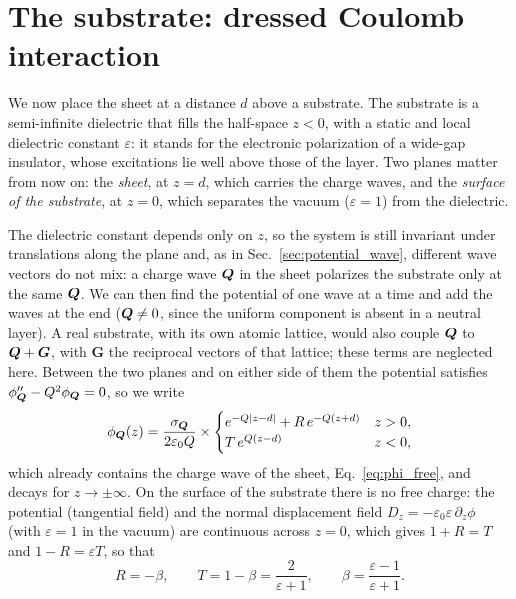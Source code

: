 \documentclass[10pt,a4paper]{paper}
\begin{document}
\section{The substrate: dressed Coulomb interaction}
\label{sec:image}

We now place the sheet at a distance $d$ above a substrate. The substrate is a semi-infinite dielectric that fills
the half-space $z < 0$, with a static and local dielectric constant $\varepsilon$: it stands for the electronic
polarization of a wide-gap insulator, whose excitations lie well above those of the layer. Two planes matter from now
on: the \emph{sheet}, at $z = d$, which carries the charge waves, and the \emph{surface of the substrate}, at
$z = 0$, which separates the vacuum ($\varepsilon = 1$) from the dielectric.

The dielectric constant depends only on $z$, so the system is still invariant under translations along the plane and,
as in Sec.~\ref{sec:potential_wave}, different wave vectors do not mix: a charge wave $\bm{Q}$ in the sheet polarizes the
substrate only at the same $\bm{Q}$. We can then find the potential of one wave at a time and add the waves at the end
($\bm{Q} \neq 0$, since the uniform component is absent in a neutral layer). A real substrate, with its own atomic
lattice, would also couple $\bm{Q}$ to $\bm{Q} + \bm{G}$, with $\bm{G}$ the reciprocal vectors of that lattice; these terms
are neglected here.
Between the two planes and on either side of them the potential satisfies $\phi''_{\bm{Q}} - Q^2\phi_{\bm{Q}} = 0$, so we
write
\begin{equation}
\phi_{\bm{Q}}(z) = \frac{\sigma_{\bm{Q}}}{2\varepsilon_0 Q}\times
\begin{cases}
e^{-Q|z-d|} + R\,e^{-Q(z+d)} & z > 0 , \\
T\,e^{Q(z-d)} & z < 0 ,
\end{cases}
\label{eq:phi_sub_ansatz}
\end{equation}
which already contains the charge wave of the sheet, Eq.~\eqref{eq:phi_free}, and decays for $z \to \pm\infty$. On
the surface of the substrate there is no free charge: the potential (tangential field) and the normal displacement
field $D_z = -\varepsilon_0\varepsilon\,\partial_z\phi$ (with $\varepsilon = 1$ in the vacuum) are continuous across
$z = 0$, which gives $1 + R = T$ and $1 - R = \varepsilon T$, so that
\begin{equation}
R = -\beta , \qquad T = 1 - \beta = \frac{2}{\varepsilon + 1} , \qquad
\beta = \frac{\varepsilon - 1}{\varepsilon + 1} .
\label{eq:image_coefficients}
\end{equation}
\end{document}
